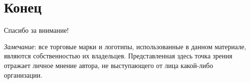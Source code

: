 \section{Конец}
\begin{frame}

{\huge{Спасибо за внимание!}\par}

\vfill

\tiny{\textit{Замечание}: все торговые марки и логотипы, использованные в данном материале, являются собственностью их владельцев. Представленная здесь точка зрения отражает личное мнение автора, не выступающего от лица какой-либо организации.}

\end{frame}

